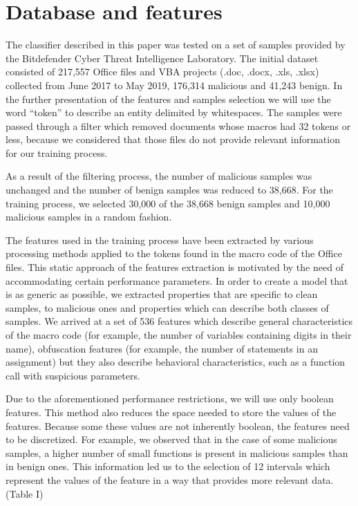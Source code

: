\section{Database and features}
\par
The classifier described in this paper was tested on a set of samples provided by the Bitdefender Cyber Threat Intelligence Laboratory. The initial dataset consisted of 217,557 Office files and VBA projects (.doc, .docx, .xls, .xlsx) collected from June 2017 to May 2019, 176,314 malicious and 41,243 benign. In the further presentation of the features and samples selection we will use the word “token” to describe an entity delimited by whitespaces. The samples were passed through a filter which removed documents whose macros had 32 tokens or less, because we considered that those files do not provide relevant information for our training process.
\par
As a result of the filtering process, the number of malicious samples was unchanged and the number of benign samples was reduced to 38,668. For the training process, we selected 30,000 of the 38,668 benign samples and 10,000 malicious samples in a random fashion.
\par
The features used in the training process have been extracted by various processing methods applied to the tokens found in the macro code of the Office files. This static approach of the features extraction is motivated by the need of accommodating certain performance parameters. In order to create a model that is as generic as possible, we extracted properties that are specific to clean samples, to malicious ones and properties which can describe both classes of samples. We arrived at a set of 536 features which describe general characteristics of the macro code (for example, the number of variables containing digits in their name), obfuscation features (for example, the number of statements in an assignment) but they also describe behavioral characteristics, such as a function call with suspicious parameters.
\par
Due to the aforementioned performance restrictions, we will use only boolean features. This method also reduces the space needed to store the values of the features. Because some these values are not inherently boolean, the features need to be discretized. For example, we observed that in the case of some malicious samples, a higher number of small functions is present in malicious samples than in benign ones. This information led us to the selection of 12 intervals which represent the values of the feature in a way that provides more relevant data. (Table I)
